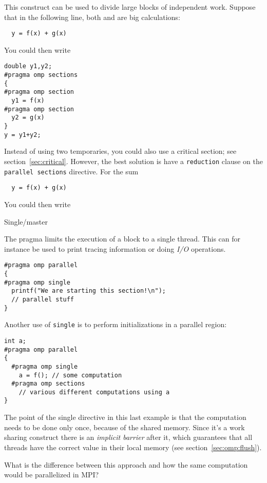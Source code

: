 This construct can be used to divide large blocks of independent work.
Suppose that in the following line, both  and 
are big calculations:
\begin{lstlisting}
  y = f(x) + g(x)
\end{lstlisting}
You could then write
\begin{lstlisting}
double y1,y2;
#pragma omp sections
{
#pragma omp section
  y1 = f(x)
#pragma omp section
  y2 = g(x)
}
y = y1+y2;
\end{lstlisting}
Instead of using two temporaries, you could also use a critical
section; see section~\ref{sec:critical}.  However, the best solution
is have a \lstinline{reduction} clause on the \lstinline{parallel sections} directive.
For the sum
\begin{lstlisting}
  y = f(x) + g(x)
\end{lstlisting}
You could then write

 {Single/master}
\label{sec:omp-single}

The  pragma
limits the execution of a block to a single thread. 
This can for instance be used to print tracing information
or doing \emph{I/O} operations.
\begin{lstlisting}
#pragma omp parallel
{
#pragma omp single
  printf("We are starting this section!\n");
  // parallel stuff
}
\end{lstlisting}
Another use of \lstinline{single} is to perform initializations
in a parallel region:
\begin{lstlisting}
int a;
#pragma omp parallel
{
  #pragma omp single
    a = f(); // some computation
  #pragma omp sections
    // various different computations using a
}
\end{lstlisting}

The point of the single directive in this last example is that the
computation needs to be done only once, because of the shared memory.
Since it's a work sharing construct there is an \emph{implicit
  barrier} after it,
which guarantees that all threads have the correct value in their
local memory (see section~\ref{sec:omp:flush}).

\begin{exercise}
  \label{ex:omp-single-mpi}
  What is the difference between this approach and how the same
  computation would be parallelized in MPI?
\end{exercise}

